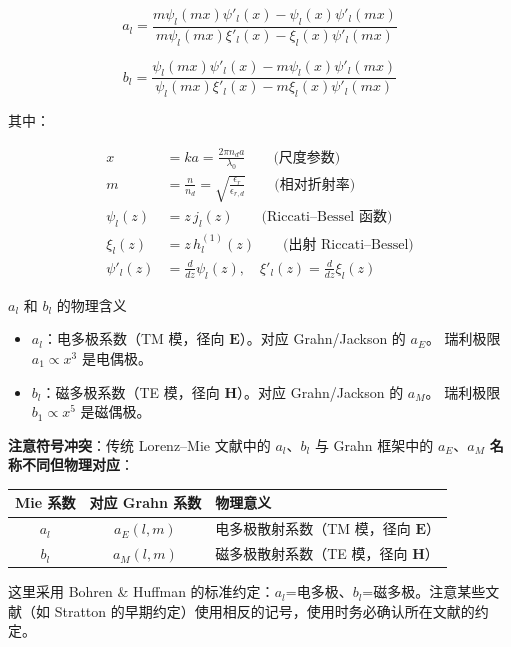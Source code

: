 \begin{equation}
  \boxed{\;
  a_l = \frac{m\psi_l(mx)\psi'_l(x) - \psi_l(x)\psi'_l(mx)}
            {m\psi_l(mx)\xi'_l(x) - \xi_l(x)\psi'_l(mx)}
  \;}
  \label{eq:mie_al}
\end{equation}

\begin{equation}
  \boxed{\;
  b_l = \frac{\psi_l(mx)\psi'_l(x) - m\psi_l(x)\psi'_l(mx)}
            {\psi_l(mx)\xi'_l(x) - m\xi_l(x)\psi'_l(mx)}
  \;}
  \label{eq:mie_bl}
\end{equation}

其中：

\begin{align}
  x &= ka = \frac{2\pi n_d a}{\lambda_0} \qquad\text{(尺度参数)} \\
  m &= \frac{n}{n_d} = \sqrt{\frac{\epsilon_r}{\epsilon_{r,d}}} \qquad\text{(相对折射率)} \\
  \psi_l(z) &= z\,j_l(z) \qquad\text{(Riccati--Bessel 函数)} \\
  \xi_l(z) &= z\,h_l^{(1)}(z) \qquad\text{(出射 Riccati--Bessel)} \\
  \psi'_l(z) &= \frac{d}{dz}\psi_l(z),\quad \xi'_l(z) = \frac{d}{dz}\xi_l(z)
\end{align}

\begin{stepbox}{$a_l$ 和 $b_l$ 的物理含义}
\begin{itemize}
  \item $a_l$：电多极系数（TM 模，径向 $\mathbf{E}$）。对应 Grahn/Jackson 的 $a_E$。
    瑞利极限 $a_1 \propto x^3$ 是电偶极。
  \item $b_l$：磁多极系数（TE 模，径向 $\mathbf{H}$）。对应 Grahn/Jackson 的 $a_M$。
    瑞利极限 $b_1 \propto x^5$ 是磁偶极。
\end{itemize}
\begin{important}
\textbf{注意符号冲突}：传统 Lorenz--Mie 文献中的 $a_l$、$b_l$ 与 Grahn 框架中的 $a_E$、$a_M$ \textbf{名称不同但物理对应}：
\begin{center}
\begin{tabular}{ccl}
\toprule
Mie 系数 & 对应 Grahn 系数 & 物理意义 \\
\midrule
$a_l$ & $a_E(l,m)$ & 电多极散射系数（TM 模，径向 $\mathbf{E}$） \\
$b_l$ & $a_M(l,m)$ & 磁多极散射系数（TE 模，径向 $\mathbf{H}$） \\
\bottomrule
\end{tabular}
\end{center}
这里采用 Bohren \& Huffman 的标准约定：$a_l$=电多极、$b_l$=磁多极。注意某些文献（如 Stratton 的早期约定）使用相反的记号，使用时务必确认所在文献的约定。
\end{important}
\end{stepbox}


